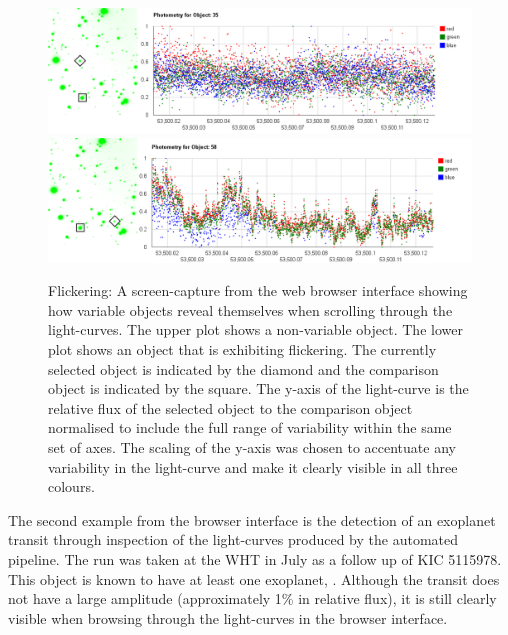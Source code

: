\begin{figure}
\centering
\includegraphics[width=150mm]{images/gumus-comparison-lc.png}
\includegraphics[width=150mm]{images/gumus-discovery-lc.png}
\caption{Flickering: A screen-capture from the web browser interface showing how variable objects reveal themselves when scrolling through the light-curves. The upper plot shows a non-variable object. The lower plot shows an object that is exhibiting flickering.  The currently selected object is indicated by the diamond and the comparison object is indicated by the square. The y-axis of the light-curve is the relative flux of the selected object to the comparison object normalised to include the full range of variability within the same set of axes. The scaling of the y-axis was chosen to accentuate any variability in the light-curve and make it clearly visible in all three colours.}
\label{fig:gumus-discovery}
\end{figure}

The second example from the browser interface is the detection of an exoplanet transit through inspection of the light-curves produced by the automated pipeline. The run was taken at the WHT in July as a follow up of KIC 5115978. This object is known to have at least one exoplanet, \citep{KIC5115978}. Although the transit does not have a large amplitude (approximately 1\% in relative flux), it is still clearly visible when browsing through the light-curves in the browser interface. 

